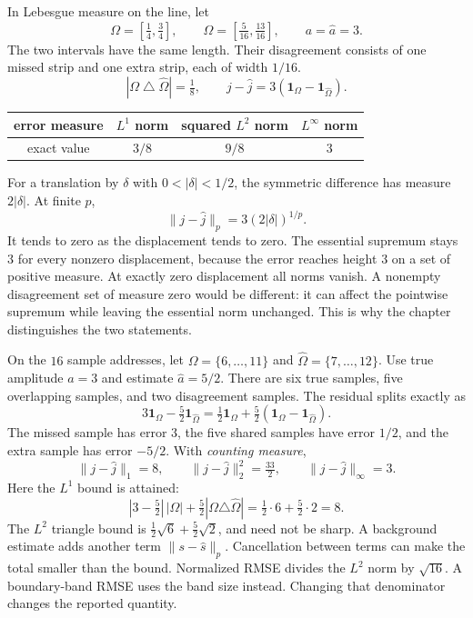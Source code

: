 In Lebesgue measure on the line, let
\[
\Omega=[\tfrac14,\tfrac34],\qquad
\widehat\Omega=[\tfrac5{16},\tfrac{13}{16}],\qquad a=\widehat a=3.
\]
The two intervals have the same length. Their disagreement consists of one missed strip and one extra strip, each of width $1/16$.
\[
|\Omega\mathbin{\triangle}\widehat\Omega|=\tfrac18,
\qquad j-\widehat j=3(\mathbf1_\Omega-\mathbf1_{\widehat\Omega}).
\]
\begin{center}
\begin{tabular}{c|ccc}
error measure & $L^1$ norm & squared $L^2$ norm & $L^\infty$ norm\\\hline
exact value & $3/8$ & $9/8$ & $3$
\end{tabular}
\end{center}
For a translation by $\delta$ with $0<|\delta|<1/2$, the symmetric difference has measure $2|\delta|$. At finite $p$,
\[
\|j-\widehat j\|_p=3(2|\delta|)^{1/p}.
\]
It tends to zero as the displacement tends to zero. The essential supremum stays $3$ for every nonzero displacement, because the error reaches height $3$ on a set of positive measure. At exactly zero displacement all norms vanish.
A nonempty disagreement set of measure zero would be different: it can affect the pointwise supremum while leaving the essential norm unchanged. This is why the chapter distinguishes the two statements.

On the $16$ sample addresses, let $\Omega=\{6,\ldots,11\}$ and $\widehat\Omega=\{7,\ldots,12\}$. Use true amplitude $a=3$ and estimate $\widehat a=5/2$. There are six true samples, five overlapping samples, and two disagreement samples.
The residual splits exactly as
\[
3\mathbf1_\Omega-\tfrac52\mathbf1_{\widehat\Omega}
=\tfrac12\mathbf1_\Omega+\tfrac52(\mathbf1_\Omega-\mathbf1_{\widehat\Omega}).
\]
The missed sample has error $3$, the five shared samples have error $1/2$, and the extra sample has error $-5/2$. With \emph{counting measure},
\[
\|j-\widehat j\|_1=8,
\qquad \|j-\widehat j\|_2^2=\tfrac{33}{2},
\qquad \|j-\widehat j\|_\infty=3.
\]
Here the $L^1$ bound is attained:
\[
|3-\tfrac52|\,|\Omega|+\tfrac52|\Omega\triangle\widehat\Omega|
=\tfrac12\cdot6+\tfrac52\cdot2=8.
\]
The $L^2$ triangle bound is $\frac12\sqrt6+\frac52\sqrt2$, and need not be sharp. A background estimate adds another term $\|s-\widehat s\|_p$. Cancellation between terms can make the total smaller than the bound.
Normalized RMSE divides the $L^2$ norm by $\sqrt{16}$. A boundary-band RMSE uses the band size instead. Changing that denominator changes the reported quantity.

